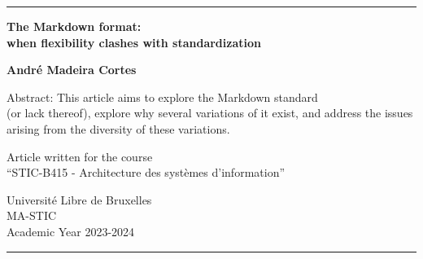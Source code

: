 \begin{titlepage}
	\center

	\rule{\linewidth}{1pt} %

	\vspace{2cm}

	\Large \textbf{
		The Markdown format: \\ \vspace{0.2cm} when flexibility clashes with standardization
	}

	\vspace{2cm}

	\large \textbf{ André Madeira Cortes }

	\vspace{3cm}

	Abstract: This article aims to explore the Markdown standard \\ (or lack thereof), explore why several variations of it exist, and address the issues arising from the diversity of these variations.

	\vspace{3cm}

	Article written for the course \\ ``STIC-B415 - Architecture des systèmes d'information'' \\

	\vspace{0.8cm}

	Université Libre de Bruxelles\\
	MA-STIC \\
	Academic Year 2023-2024

	\rule{\linewidth}{1pt} %
\end{titlepage}
